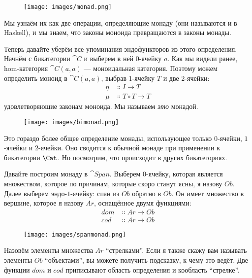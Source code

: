 \begin{figure}[H]
  \centering
  \texttt{[image: images/monad.png]}
\end{figure}

\noindent
Мы узнаём их как две операции, определяющие монаду (они
называются  и  в Haskell), и мы знаем, что
законы моноида превращаются в законы монады.

Теперь давайте уберём все упоминания эндофункторов из этого определения. Начнём
с бикатегории $\cat{C}$ и выберем в ней $0$-ячейку $a$.
Как мы видели ранее, hom-категория $\cat{C}(a, a)$ — моноидальная
категория. Поэтому можем определить моноид в $\cat{C}(a, a)$,
выбрав $1$-ячейку $T$ и две $2$-ячейки:
\begin{align*}
  \eta & \Colon I \to T         \\
  \mu  & \Colon T \circ T \to T
\end{align*}
удовлетворяющие законам моноида. Мы называем \emph{это} монадой.

\begin{figure}[H]
  \centering
  \texttt{[image: images/bimonad.png]}
\end{figure}

\noindent
Это гораздо более общее определение монады, использующее только $0$-ячейки,
$1$-ячейки и $2$-ячейки. Оно сводится к обычной монаде при применении к
бикатегории $\Cat$. Но посмотрим, что происходит в других
бикатегориях.

Давайте построим монаду в $\cat{Span}$. Выберем $0$-ячейку, которая является
множеством, которое по причинам, которые скоро станут ясны, я назову
$\mathit{Ob}$. Далее выберем эндо-$1$-ячейку: спан из $\mathit{Ob}$ обратно
в $\mathit{Ob}$. Он имеет множество в вершине, которое я назову $\mathit{Ar}$,
оснащённое двумя функциями:
\begin{align*}
  \mathit{dom} & \Colon \mathit{Ar} \to \mathit{Ob} \\
  \mathit{cod} & \Colon \mathit{Ar} \to \mathit{Ob}
\end{align*}

\begin{figure}[H]
  \centering
  \texttt{[image: images/spanmonad.png]}
\end{figure}

\noindent
Назовём элементы множества $\mathit{Ar}$ ``стрелками''. Если я также
скажу вам называть элементы $\mathit{Ob}$ ``объектами'', вы можете получить
подсказку, к чему это ведёт. Две функции $\mathit{dom}$ и
$\mathit{cod}$ приписывают область определения и кообласть ``стрелке''.

